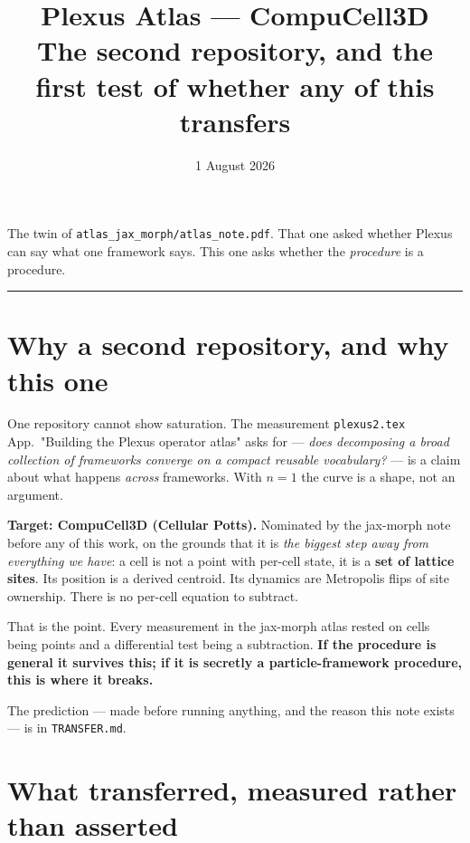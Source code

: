 \documentclass[11pt,a4paper]{article}
\title{\textbf{Plexus Atlas --- CompuCell3D}\\[6pt]
\large The second repository, and the first test of whether any of this transfers}
\author{}
\date{1 August 2026}
\newcommand{\code}[1]{\texttt{#1}}
\begin{document}
\maketitle
\vspace{-2.2\baselineskip}

\begin{center}\small\color{grey}
The twin of \texttt{atlas\_jax\_morph/atlas\_note.pdf}. That one asked whether Plexus can say what
one framework says. This one asks whether the \emph{procedure} is a procedure.
\end{center}

\vspace{4pt}
\hrule
\vspace{10pt}

\section{Why a second repository, and why this one}

One repository cannot show saturation. The measurement \texttt{plexus2.tex} App.~"Building the Plexus operator atlas" asks for ---
\emph{does decomposing a broad collection of frameworks converge on a compact reusable
vocabulary?} --- is a claim about what happens \emph{across} frameworks. With $n=1$ the curve is a
shape, not an argument.

\textbf{Target: CompuCell3D (Cellular Potts).} Nominated by the jax-morph note before any of this
work, on the grounds that it is \emph{the biggest step away from everything we have}: a cell is not
a point with per-cell state, it is a \textbf{set of lattice sites}. Its position is a derived
centroid. Its dynamics are Metropolis flips of site ownership. There is no per-cell equation to
subtract.

That is the point. Every measurement in the jax-morph atlas rested on cells being points and a
differential test being a subtraction. \textbf{If the procedure is general it survives this; if it
is secretly a particle-framework procedure, this is where it breaks.}

The prediction --- made before running anything, and the reason this note exists --- is in
\code{TRANSFER.md}.

\section{What transferred, measured rather than asserted}
\end{document}

